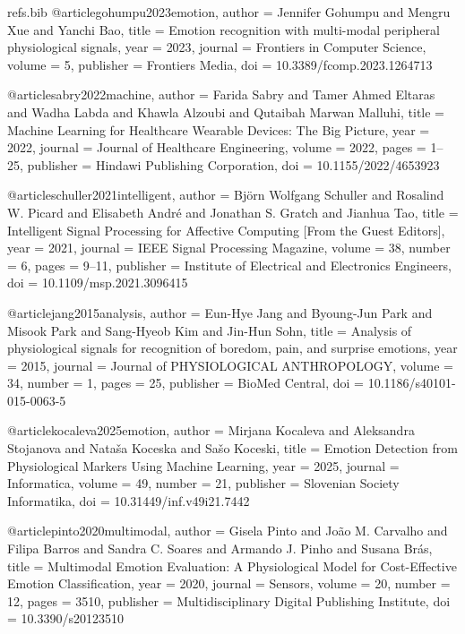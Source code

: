 \begin{filecontents*}[overwrite]{refs.bib}
@article{gohumpu2023emotion,
  author = {Jennifer Gohumpu and Mengru Xue and Yanchi Bao},
  title = {{Emotion recognition with multi-modal peripheral physiological signals}},
  year = {2023},
  journal = {Frontiers in Computer Science},
  volume = {5},
  publisher = {Frontiers Media},
  doi = {10.3389/fcomp.2023.1264713}
}

@article{sabry2022machine,
  author = {Farida Sabry and Tamer Ahmed Eltaras and Wadha Labda and Khawla Alzoubi and Qutaibah Marwan Malluhi},
  title = {{Machine Learning for Healthcare Wearable Devices: The Big Picture}},
  year = {2022},
  journal = {Journal of Healthcare Engineering},
  volume = {2022},
  pages = {1--25},
  publisher = {Hindawi Publishing Corporation},
  doi = {10.1155/2022/4653923}
}

@article{schuller2021intelligent,
  author = {Bj{\"o}rn Wolfgang Schuller and Rosalind W. Picard and Elisabeth Andr{\'e} and Jonathan S. Gratch and Jianhua Tao},
  title = {{Intelligent Signal Processing for Affective Computing [From the Guest Editors]}},
  year = {2021},
  journal = {IEEE Signal Processing Magazine},
  volume = {38},
  number = {6},
  pages = {9--11},
  publisher = {Institute of Electrical and Electronics Engineers},
  doi = {10.1109/msp.2021.3096415}
}

@article{jang2015analysis,
  author = {Eun-Hye Jang and Byoung{-}Jun Park and Misook Park and Sang{-}Hyeob Kim and Jin{-}Hun Sohn},
  title = {{Analysis of physiological signals for recognition of boredom, pain, and surprise emotions}},
  year = {2015},
  journal = {Journal of PHYSIOLOGICAL ANTHROPOLOGY},
  volume = {34},
  number = {1},
  pages = {25},
  publisher = {BioMed Central},
  doi = {10.1186/s40101-015-0063-5}
}

@article{kocaleva2025emotion,
  author = {Mirjana Kocaleva and Aleksandra Stojanova and Nata{\v{s}}a Koceska and Sa{\v{s}}o Koceski},
  title = {{Emotion Detection from Physiological Markers Using Machine Learning}},
  year = {2025},
  journal = {Informatica},
  volume = {49},
  number = {21},
  publisher = {Slovenian Society Informatika},
  doi = {10.31449/inf.v49i21.7442}
}

@article{pinto2020multimodal,
  author = {Gisela Pinto and Jo{\~a}o M. Carvalho and Filipa Barros and Sandra C. Soares and Armando J. Pinho and Susana Br{\'a}s},
  title = {{Multimodal Emotion Evaluation: A Physiological Model for Cost-Effective Emotion Classification}},
  year = {2020},
  journal = {Sensors},
  volume = {20},
  number = {12},
  pages = {3510},
  publisher = {Multidisciplinary Digital Publishing Institute},
  doi = {10.3390/s20123510}
}


\end{filecontents*}
